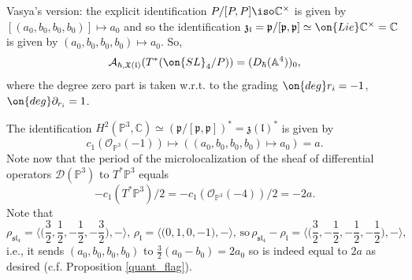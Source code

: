 \documentclass[12pt]{amsart}
\begin{document}
    
    
    
    
    Vasya's version: the explicit identification $P/[P,P] \iso \mathbb{C}^\times$ is given by $[(a_0,b_0,b_0,b_0)] \mapsto a_0$ and so the identification $\mathfrak{z}_{\mathfrak{l}}=\mathfrak{p}/[\mathfrak{p},\mathfrak{p}] \simeq \on{Lie}\mathbb{C}^\times = \mathbb{C}$ is given by $(a_0,b_0,b_0,b_0) \mapsto a_0$. So, 
    \begin{equation*}
    \mathcal{A}_{\hbar,\mathfrak{X}(\mathfrak{l})}(T^*(\on{SL}_4/P)) = (D_{\hbar}(\mathbb{A}^4))_0,    \end{equation*}
    where the degree zero part is taken w.r.t. to the grading $\on{deg}r_i=-1$, $\on{deg}\partial_{r_i}=1$. 
    


   
    The identification $H^2(\mathbb{P}^3,\mathbb{C}) \simeq (\mathfrak{p}/[\mathfrak{p},\mathfrak{p}])^*=\mathfrak{z}(\mathfrak{l})^*$ is given by 
    \begin{equation*}
    c_1(\mathcal{O}_{\mathbb{P}^3}(-1)) \mapsto ((a_0,b_0,b_0,b_0) \mapsto a_0)=a.
    \end{equation*}
    Note now that the period of the microlocalization of the sheaf of differential operators $\mathcal{D}(\mathbb{P}^3)$ to $T^*\mathbb{P}^3$ equals 
    \begin{equation*}
    -c_1(T^*\mathbb{P}^3)/2=-c_1(\mathcal{O}_{\mathbb{P}^3}(-4))/2=-2a.
    \end{equation*}
    Note that 
 \begin{equation*}
 \rho_{\mathfrak{sl}_4}=\Big\langle\Big(\frac{3}{2},\frac{1}{2},-\frac{1}{2},-\frac{3}{2}\Big),-\Big\rangle, \,\rho_{\mathfrak{l}}=\Big\langle\Big(0,1,0,-1\Big),-\Big\rangle,\,\text{so}\,\rho_{\mathfrak{sl}_4}-\rho_{\mathfrak{l}}=\Big\langle\Big(\frac{3}{2},-\frac{1}{2},-\frac{1}{2},-\frac{1}{2}\Big),-\Big\rangle,
 \end{equation*} 
 i.e., it sends $(a_0,b_0,b_0,b_0)$ to $\frac{3}{2}(a_0-b_0)=2a_0$ so is indeed equal to $2a$ as desired (c.f. Proposition \ref{quant_flag}).
     
    
    
    
    
    
    
\end{document}
